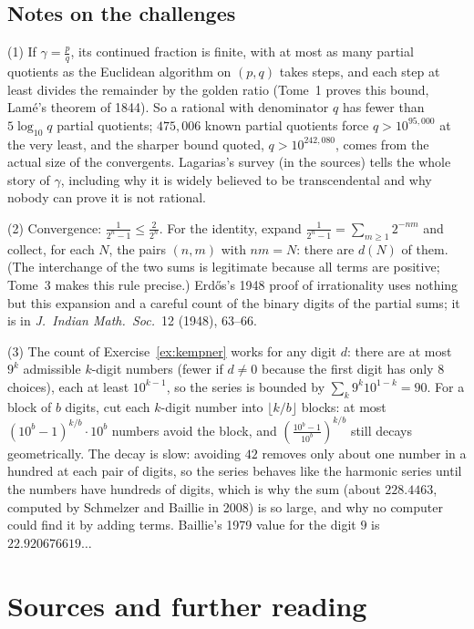 \subsection*{Notes on the challenges}

(1) If $\gamma=\frac pq$, its continued fraction is finite, with at most as many partial quotients as the Euclidean algorithm on $(p,q)$ takes steps, and
each step at least divides the remainder by the golden ratio (Tome~1 proves this bound, Lam\'e's theorem of 1844). So a rational with denominator $q$ has
fewer than $5\log_{10}q$ partial quotients; $475{,}006$ known partial quotients force $q>10^{95{,}000}$ at the very least, and the sharper bound quoted,
$q>10^{242{,}080}$, comes from the actual size of the convergents. Lagarias's survey (in the sources) tells the whole story of $\gamma$, including why
it is widely believed to be transcendental and why nobody can prove it is not rational.

(2) Convergence: $\frac1{2^n-1}\le\frac2{2^n}$. For the identity, expand $\frac1{2^n-1}=\sum_{m\ge1}2^{-nm}$ and collect, for each $N$, the pairs $(n,m)$ with $nm=N$:
there are $d(N)$ of them. (The interchange of the two sums is legitimate because all terms are positive; Tome~3 makes this rule precise.) Erd\H{o}s's 1948
proof of irrationality uses nothing but this expansion and a careful count of the binary digits of the partial sums; it is in \emph{J.\ Indian Math.\ Soc.}\ 12 (1948), 63--66.

(3) The count of Exercise~\ref{ex:kempner} works for any digit $d$: there are at most $9^k$ admissible $k$-digit numbers (fewer if $d\ne0$ because the first
digit has only $8$ choices), each at least $10^{k-1}$, so the series is bounded by $\sum_k9^k10^{1-k}=90$. For a block of $b$ digits, cut each $k$-digit number
into $\lfloor k/b\rfloor$ blocks: at most $(10^b-1)^{k/b}\cdot10^{b}$ numbers avoid the block, and $\left(\frac{10^b-1}{10^b}\right)^{k/b}$ still decays
geometrically. The decay is slow: avoiding $42$ removes only about one number in a hundred at each pair of digits, so the series behaves like the
harmonic series until the numbers have hundreds of digits, which is why the sum (about $228.4463$, computed by Schmelzer and Baillie in 2008) is so large, and why
no computer could find it by adding terms. Baillie's 1979 value for the digit $9$ is $22.920676619\ldots$

\section*{Sources and further reading}

